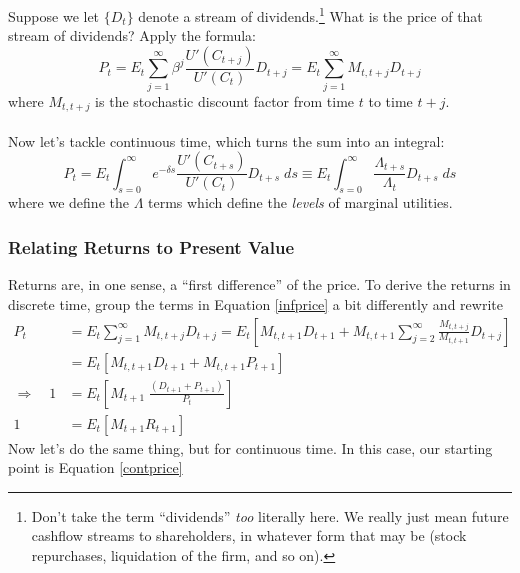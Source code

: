 \documentclass[a4paper,12pt]{scrartcl}
\begin{document}
Suppose we let $\{D_t\}$ denote a stream of
dividends.\footnote{Don't take the term ``dividends'' \emph{too}
    literally here. We really just mean future cashflow streams
    to shareholders, in whatever form that may be
    (stock repurchases, liquidation of the firm, and so on).}
What is the price of that stream of dividends? Apply
the formula:
\begin{equation}
    \label{infprice}
    P_t = E_t \sum^\infty_{j = 1} \beta^j
	\frac{U'(C_{t+j})}{U'(C_{t})} D_{t+j}
	= E_t \sum^\infty_{j = 1} M_{t, t+j} D_{t+j}
\end{equation}
where $M_{t,t+j}$ is the stochastic discount factor
from time $t$ to time $t+j$.
\\
\\
Now let's tackle continuous time, which turns the
sum into an integral:
\begin{equation}
    \label{contprice}
    P_t = E_t \int^\infty_{s = 0}  e^{-\delta s}
	\frac{U'(C_{t+s})}{U'(C_{t})} D_{t+s} \; ds
	\equiv E_t \int^\infty_{s = 0}
	\frac{\Lambda_{t+s}}{\Lambda_{t}} D_{t+s} \; ds
\end{equation}
where we define the $\Lambda$ terms which define the
\emph{levels} of marginal utilities.

\subsubsection{Relating Returns to Present Value}

Returns are, in one sense, a ``first difference'' of
the price. To derive the returns in discrete time,
group the terms in Equation \ref{infprice} a bit
differently and rewrite
\begin{align*}
    P_t &= E_t \sum^\infty_{j = 1} M_{t, t+j} D_{t+j}
	= E_t\left[M_{t, t+1} D_{t+1}  + M_{t, t+1}
	\sum^\infty_{j = 2} \frac{M_{t, t+j}}{M_{t, t+1}}
	D_{t+j} \right] \\
    &= E_t\left[M_{t, t+1} D_{t+1}  + M_{t, t+1}
	P_{t+1} \right] \\
    \Rightarrow \quad 1 &= E_t\left[ M_{t+1} \;
	\frac{(D_{t+1} + P_{t+1})}{P_t} \right] \\
    1 &= E_t\left[ M_{t+1}
	R_{t+1} \right]
\end{align*}
Now let's do the same thing, but for continuous time.
In this case, our starting point is Equation \ref{contprice}





\newpage
\appendix
\end{document}
